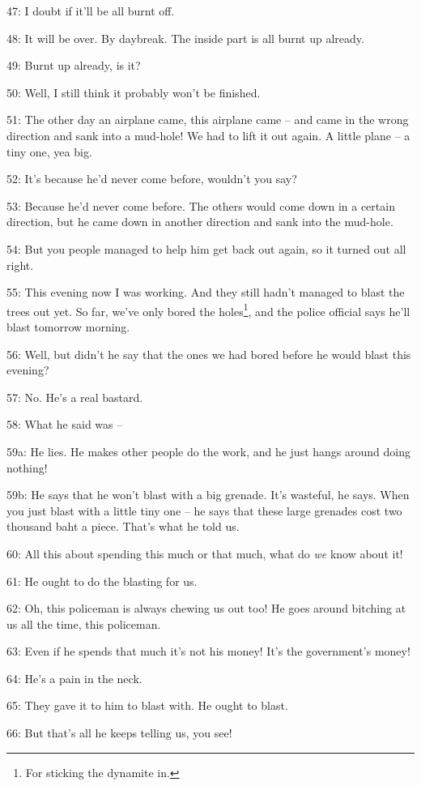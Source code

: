 47: I doubt if it'll be all burnt off.

48: It will be over. By daybreak. The inside part is all burnt up already.

49: Burnt up already, is it?

50: Well, I still think it probably won't be finished.

51: The other day an airplane came, this airplane came -- and came in the wrong
direction and sank into a mud-hole! We had to lift it out again. A little plane
-- a tiny one, yea big.

52: It's because he'd never come before, wouldn't you say?

53: Because he'd never come before. The others would come down in a certain direction,
but he came down in another direction and sank into the mud-hole.

54: But you people managed to help him get back out again, so it turned out all
right.

55: This evening now I was working. And they still hadn't managed to blast the
trees out yet. So far, we've only bored the holes\footnote{For sticking the dynamite in.}, and the police official says
he'll blast tomorrow morning.

56: Well, but didn't he say that the ones we had bored before he would blast this
evening?

57: No. He's a real bastard.

58: What he said was --

59a: He lies. He makes other people do the work, and he just hangs around doing
nothing!

59b: He says that he won't blast with a big grenade. It's wasteful, he says. When
you just blast with a little tiny one -- he says that these large grenades cost
two thousand baht a piece. That's what he told us.

60: All this about spending this much or that much, what do \textit{we} know about
it!

61: He ought to do the blasting for us.

62: Oh, this policeman is always chewing us out too! He goes around bitching at
us all the time, this policeman.

63: Even if he spends that much it's not his money! It's the government's money!

64: He's a pain in the neck.

65: They gave it to him to blast with. He ought to blast.

66: But that's all he keeps telling us, you see!

